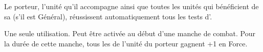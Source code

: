 Le porteur, l'unité qu'il accompagne ainsi que toutes les unités qui bénéficient de sa \inspiringpresence{} (s'il est Général), réussissent automatiquement tous les tests d'\primalinstinct{}.

\endpricelist

\armymagicalbanners

\startpricelist

Une seule utilisation. Peut être activée au début d'une manche de combat. Pour la durée de cette manche, tous les \wildhorns{} de l'unité du porteur gagnent +1 en Force.

\endpricelist

\closearmymagicalitems








\quickrefsheettitle


\bigskip

\restoregeometry

